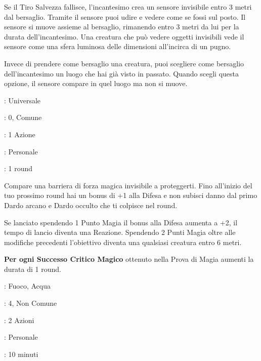 \begin{multicols}{2}
Se il Tiro Salvezza fallisce, l'incantesimo crea un sensore invisibile entro 3 metri dal bersaglio. Tramite il sensore puoi udire e vedere come se fossi sul posto. Il sensore si muove assieme al bersaglio, rimanendo entro 3 metri da lui per la durata dell'incantesimo. Una creatura che può vedere oggetti invisibili vede il sensore come una sfera luminosa delle dimensioni all'incirca di un pugno.

Invece di prendere come bersaglio una creatura, puoi scegliere come bersaglio dell'incantesimo un luogo che hai già visto in passato. Quando scegli questa opzione, il sensore compare in quel luogo ma non si muove.

\noindent\colorbox{OBSSgold!10}{
\begin{minipage}{0.95\linewidth}
\begin{description}[noitemsep, topsep=0pt, parsep=0pt, partopsep=0pt, leftmargin=0cm, labelwidth=1.3cm]
	\item[\textbf{Lista}]: Universale
	\item[\textbf{Livello}]: 0, Comune
	\item[\textbf{Lancio}]: 1 Azione
	\item[\textbf{Gittata}]: Personale
	\item[\textbf{Durata}]: 1 round
\end{description}
\end{minipage}}\smallskip

Compare una barriera di forza magica invisibile a proteggerti. Fino all'inizio del tuo prossimo round hai un bonus di +1 alla Difesa e non subisci danno dal primo Dardo arcano e Dardo occulto che ti colpisce nel round.

Se lanciato spendendo 1 Punto Magia il bonus alla Difesa aumenta a +2, il tempo di lancio diventa una Reazione. Spendendo 2 Punti Magia oltre alle modifiche precedenti l'obiettivo diventa una qualsiasi creatura entro 6 metri.

\textbf{Per ogni Successo Critico Magico} ottenuto nella Prova di Magia aumenti la durata di 1 round.

\noindent\colorbox{OBSSgold!10}{
\begin{minipage}{0.95\linewidth}
\begin{description}[noitemsep, topsep=0pt, parsep=0pt, partopsep=0pt, leftmargin=0cm, labelwidth=1.3cm]
	\item[\textbf{Lista}]: Fuoco, Acqua
	\item[\textbf{Livello}]: 4, Non Comune
	\item[\textbf{Lancio}]: 2 Azioni
	\item[\textbf{Gittata}]: Personale
	\item[\textbf{Durata}]: 10 minuti
\end{description}
\end{minipage}}\smallskip


\end{multicols}
